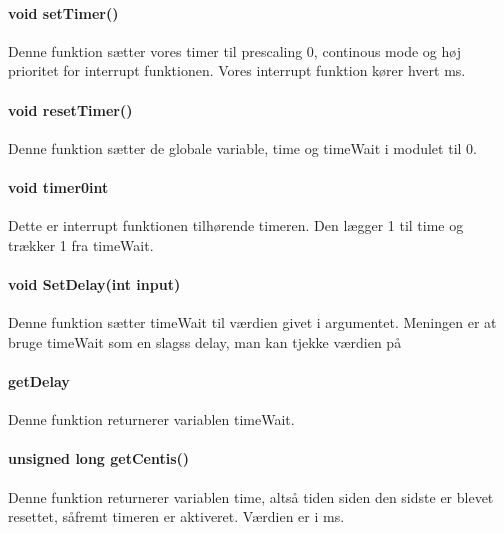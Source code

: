 \paragraph{void setTimer()}
Denne funktion sætter vores timer til prescaling 0, continous mode og høj prioritet for interrupt funktionen. Vores interrupt funktion kører hvert ms.
\paragraph{void resetTimer()}
Denne funktion sætter de globale variable, time og timeWait i modulet til 0.
\paragraph{void timer0int}
Dette er interrupt funktionen tilhørende timeren. Den lægger 1 til time og trækker 1 fra timeWait. 
\paragraph{void SetDelay(int input)}
Denne funktion sætter timeWait til værdien givet i argumentet. Meningen er at bruge timeWait som en slagss delay, man kan tjekke værdien på
\paragraph{getDelay}
Denne funktion returnerer variablen timeWait.
\paragraph{unsigned long getCentis()}
Denne funktion returnerer variablen time, altså tiden siden den sidste er blevet resettet, såfremt timeren er aktiveret. Værdien er i ms.
